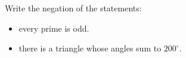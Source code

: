 \guard



\begin{exmp}
\label{exmp:negateQuantifiedStatement}
	Write the negation of the statements:
	\begin{itemize}
		\item every prime is odd.
		\item there is a triangle whose angles sum to $200^\circ$.
	\end{itemize}
\end{exmp}

